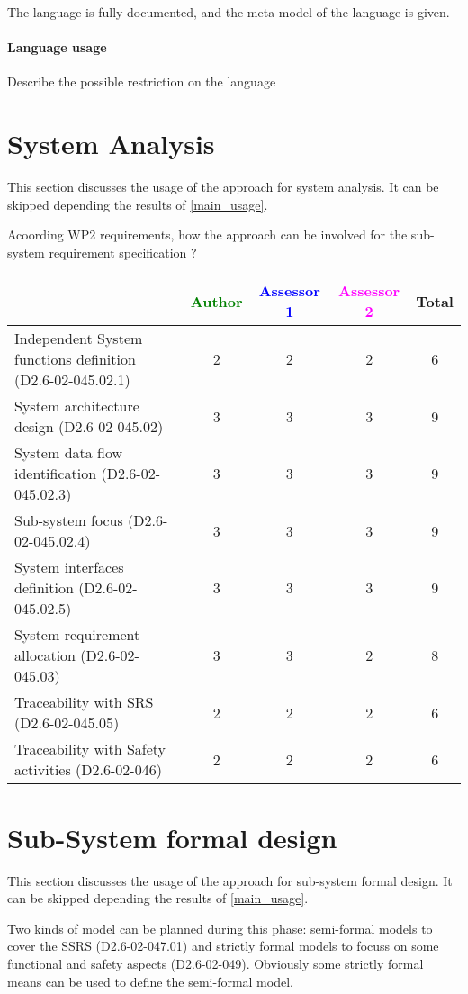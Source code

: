 The language is fully documented, and the meta-model of the language
is given.
\paragraph{Language usage} Describe the possible restriction on the language

\section{System Analysis}
This section discusses the usage of the approach for system analysis.
It can be skipped depending the results of \ref{main_usage}.

Acoording WP2 requirements, how the approach can be involved for the sub-system requirement specification ?

\begin{tabular}{|l | c | c | c | c|}
\hline
& \textcolor{green}{Author} & \textcolor{blue}{Assessor 1} & \textcolor{magenta}{Assessor 2} & Total \\
\hline
Independent System functions definition (D2.6-02-045.02.1)  &2 &2 & 2& 6 \\
\hline 
System architecture design (D2.6-02-045.02) &3 &3 & 3& 9 \\
\hline
System data flow identification (D2.6-02-045.02.3)  &3 &3 & 3& 9 \\
\hline
Sub-system focus (D2.6-02-045.02.4)  &3 &3 & 3& 9 \\
\hline
System interfaces definition (D2.6-02-045.02.5)  &3 &3 & 3& 9 \\
\hline
System requirement allocation (D2.6-02-045.03)  &3 &3 & 2&  8 \\
\hline
Traceability with SRS (D2.6-02-045.05)  &2 &2 & 2& 6  \\
\hline
Traceability with Safety activities (D2.6-02-046)  &2 &2 & 2 & 6   \\
\hline
\end{tabular}



\section{Sub-System formal design}
This section discusses the usage of the approach for sub-system formal design.
It can be skipped depending the results of \ref{main_usage}.

Two kinds of model can be planned during this phase: semi-formal models to  cover the SSRS (D2.6-02-047.01) and strictly formal  models to  focuss on some functional and safety aspects (D2.6-02-049).  Obviously some strictly  formal means can be used to define the semi-formal  model.

